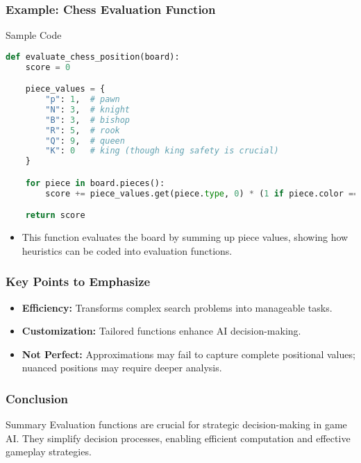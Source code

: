 \documentclass[aspectratio=169]{beamer}
\begin{document}
\begin{frame}[fragile]
  \frametitle{Example: Chess Evaluation Function}
  \begin{block}{Sample Code}
    \begin{lstlisting}[language=Python]
def evaluate_chess_position(board):
    score = 0

    piece_values = {
        "p": 1,  # pawn
        "N": 3,  # knight
        "B": 3,  # bishop
        "R": 5,  # rook
        "Q": 9,  # queen
        "K": 0   # king (though king safety is crucial)
    }

    for piece in board.pieces():
        score += piece_values.get(piece.type, 0) * (1 if piece.color == "white" else -1)

    return score
    \end{lstlisting}
  \end{block}
  
  \begin{itemize}
    \item This function evaluates the board by summing up piece values, showing how heuristics can be coded into evaluation functions.
  \end{itemize}
\end{frame}

\begin{frame}
  \frametitle{Key Points to Emphasize}
  \begin{itemize}
    \item \textbf{Efficiency:} Transforms complex search problems into manageable tasks.
    \item \textbf{Customization:} Tailored functions enhance AI decision-making.
    \item \textbf{Not Perfect:} Approximations may fail to capture complete positional values; nuanced positions may require deeper analysis.
  \end{itemize}
\end{frame}

\begin{frame}
  \frametitle{Conclusion}
  \begin{block}{Summary}
    Evaluation functions are crucial for strategic decision-making in game AI. They simplify decision processes, enabling efficient computation and effective gameplay strategies.
  \end{block}
\end{frame}
\end{document}

